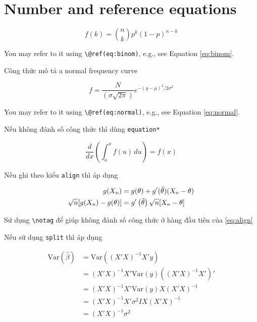 \documentclass[
]{book}
\theoremstyle{definition}
\theoremstyle{definition}
\theoremstyle{definition}
\theoremstyle{definition}
\theoremstyle{remark}
\begin{document}
\hypertarget{number-and-reference-equations}{%
\section{Number and reference equations}\label{number-and-reference-equations}}

\begin{equation} 
  f\left(k\right) = \binom{n}{k} p^k\left(1-p\right)^{n-k}
  \label{eq:binom}
\end{equation}

You may refer to it using \texttt{\textbackslash{}@ref(eq:binom)}, e.g., see Equation \eqref{eq:binom}.

Công thức mô tả a normal frequency curve

\begin{equation} 
  f = \frac{N}{{(\sigma \sqrt {2\pi } )}}{e^{ - {{(y - \mu )}^2}/2{\sigma ^2}}}
  \label{eq:normal}
\end{equation}

You may refer to it using \texttt{\textbackslash{}@ref(eq:normal)}, e.g., see Equation \eqref{eq:normal}.

Nếu không đánh số công thức thì dùng \texttt{equation*}

\begin{equation*} 
\frac{d}{dx}\left( \int_{a}^{x} f(u)\,du\right)=f(x)
\end{equation*}

Nếu ghi theo kiểu \texttt{align} thì áp dụng

\begin{align} 
g(X_{n}) &= g(\theta)+g'({\tilde{\theta}})(X_{n}-\theta) \notag \\

\sqrt{n}[g(X_{n})-g(\theta)] &= g'\left({\tilde{\theta}}\right)
  \sqrt{n}[X_{n}-\theta ] 

\label{eq:align}
\end{align}

Sử dụng \texttt{\textbackslash{}notag} để giúp không đánh số công thức ở hàng đầu tiên của \eqref{eq:align}

Nếu sử dụng \texttt{split} thì áp dụng

\begin{equation} 
\begin{split}
\mathrm{Var}(\hat{\beta}) & =\mathrm{Var}((X'X)^{-1}X'y)\\
 & =(X'X)^{-1}X'\mathrm{Var}(y)((X'X)^{-1}X')'\\
 & =(X'X)^{-1}X'\mathrm{Var}(y)X(X'X)^{-1}\\
 & =(X'X)^{-1}X'\sigma^{2}IX(X'X)^{-1}\\
 & =(X'X)^{-1}\sigma^{2}
\end{split}
\label{eq:var-beta}
\end{equation}
\end{document}
